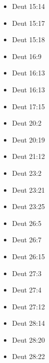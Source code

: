 \documentclass[14pt]{article}
\begin{document}
\begin{multicols}{2}
\begin{itemize}
\item Deut 15:14

\item Deut 15:17

\item Deut 15:18

\item Deut 16:9

\item Deut 16:13

\item Deut 16:13

\item Deut 17:15

\item Deut 20:2

\item Deut 20:19

\item Deut 21:12

\item Deut 23:2

\item Deut 23:21

\item Deut 23:25

\item Deut 26:5

\item Deut 26:7

\item Deut 26:15

\item Deut 27:3

\item Deut 27:4

\item Deut 27:12

\item Deut 28:14

\item Deut 28:20

\item Deut 28:22


\end{itemize}
\end{multicols}
\end{document}
